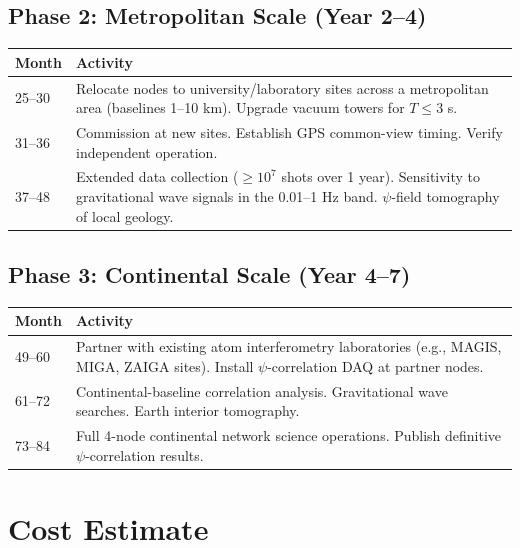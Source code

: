 \documentclass[12pt,a4paper]{article}
\begin{document}
\subsection{Phase 2: Metropolitan Scale (Year 2--4)}

\begin{table}[H]
\centering
\begin{tabular}{lp{10cm}}
\toprule
\textbf{Month} & \textbf{Activity} \\
\midrule
25--30 & Relocate nodes to university/laboratory sites across a
metropolitan area (baselines 1--10 km). Upgrade vacuum towers for
$T \leq 3$ s. \\
31--36 & Commission at new sites. Establish GPS common-view timing.
Verify independent operation. \\
37--48 & Extended data collection ($\geq 10^7$ shots over 1 year).
Sensitivity to gravitational wave signals in the 0.01--1 Hz band.
$\psi$-field tomography of local geology. \\
\bottomrule
\end{tabular}
\end{table}

\subsection{Phase 3: Continental Scale (Year 4--7)}

\begin{table}[H]
\centering
\begin{tabular}{lp{10cm}}
\toprule
\textbf{Month} & \textbf{Activity} \\
\midrule
49--60 & Partner with existing atom interferometry laboratories
(e.g., MAGIS, MIGA, ZAIGA sites). Install $\psi$-correlation
DAQ at partner nodes. \\
61--72 & Continental-baseline correlation analysis. Gravitational
wave searches. Earth interior tomography. \\
73--84 & Full 4-node continental network science operations.
Publish definitive $\psi$-correlation results. \\
\bottomrule
\end{tabular}
\end{table}


\section{Cost Estimate}\label{sec:cost}
\end{document}
